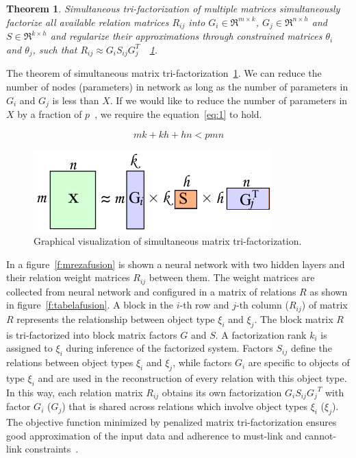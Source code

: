 \documentclass{article} %
\newtheorem{theorem}{Theorem}[section]
\begin{document}
\begin{theorem}\label{t:2}
Simultaneous tri-factorization of multiple matrices simultaneously 
factorize all available relation matrices $R_{ij}$ into $G_i \in \Re^{m \times 
k}$, $G_j \in \Re^{n \times h}$ and $S \in \Re^{k \times h}$ and regularize 
their approximations through constrained matrices $\theta_i$ and $\theta_j$, 
such that $R_{ij} \approx G_iS_{ij}G_j^T$~\cite{zitnik2015data}~\ref{f:mf2}.
\end{theorem} 

The theorem of simultaneous matrix tri-factorization~\ref{t:2}. We can reduce
the number of nodes (parameters) in network as long as the number of parameters
in $G_i$ and $G_j$ is less than $X$. If we would like to reduce the number of
parameters in $X$ by a fraction of $p$~\cite{sainath2013low}, we require the
equation~\ref{eq:1} to hold.

\begin{equation} \label{eq:1}
 mk + kh + hn < pmn
\end{equation}


\begin{figure}[!ht]
\centering 
\includegraphics[width=.5\textwidth]{mf2.png}
\caption{Graphical visualization of simultaneous matrix tri-factorization.}
\label{f:mf2}
\end{figure}


\newpage

In a figure~\ref{f:mrezafusion} is shown a neural network with two hidden
layers and their relation weight matrices $R_{ij}$ between them. The weight
matrices are collected from neural network and configured in a matrix of
relations $R$ as shown in figure~\ref{f:tabelafusion}. A block in the $i$-th
row and $j$-th column ($R_{ij}$) of matrix $R$ represents the relationship
between object type $\xi_i$ and $\xi_j$. The block matrix $R$ is tri-factorized
into block matrix factors $G$ and $S$. A factorization rank $k_i$ is assigned
to $\xi_i$ during inference of the factorized system. Factors $S_{ij}$ define
the relations between object types $\xi_i$ and $\xi_j$, while factors $G_i$ are
specific to objects of type $\xi_i$ and are used in the reconstruction of every
relation with this object type. In this way, each relation matrix $R_{ij}$
obtains its own factorization $G_i S_{ij} {G_j}^T$ with factor $G_i$ ($G_j$)
that is shared across relations which involve object types $\xi_i$ ($\xi_j$).
The objective function minimized by penalized matrix tri-factorization ensures
good approximation of the input data and adherence to must-link and cannot-link
constraints~\cite{zitnik2015data}.
\end{document}
